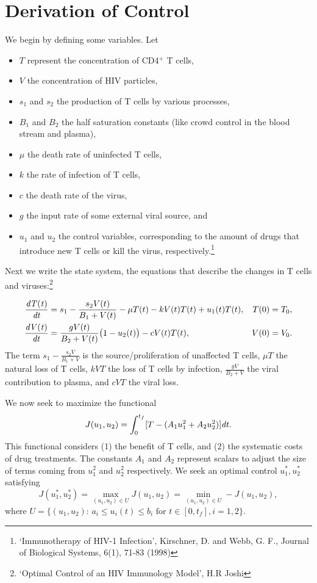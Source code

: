 \section*{Derivation of Control}
We begin by defining some variables.
Let

\begin{itemize}
    \item $T$ represent the concentration of CD4$^+$ T cells,
    \item $V$ the concentration of HIV particles,
    \item $s_1$ and $s_2$ the production of T cells by various processes,
    \item $B_1$ and $B_2$ the half saturation constants (like crowd control in the blood stream and plasma),
    \item $\mu$ the death rate of uninfected T cells,
    \item $k$ the rate of infection of T cells,
    \item $c$ the death rate of the virus,
    \item $g$ the input rate of some external viral source, and
    \item $u_1$ and $u_2$ the control variables, corresponding to the amount of drugs that introduce new T cells or kill the virus, respectively.\footnote{`Immunotherapy of HIV-1 Infection', Kirschner, D. and Webb, G. F., Journal of Biological Systems, 6(1), 71-83 (1998)}
\end{itemize}

Next we write the state system, the equations that describe the changes in T cells and viruses:\footnote{`Optimal Control of an HIV Immunology Model', H.R Joshi}

\begin{equation}
	\begin{alignedat}{2}
		\frac{\it{d}T(t)}{\it{dt}} &= s_1 - \frac{s_2V(t)}{B_1+V(t)} - \mu T(t)-kV(t)T(t)+u_1(t)T(t), \quad & T(0) &= T_0, \\
		\frac{\it{d}V(t)}{\it{dt}} &= \frac{gV(t)}{B_2+V(t)}\big(1-u_2(t)\big) - cV(t)T(t), & V(0) &= V_0.
	\end{alignedat}
    \label{eq:hiv:state}
\end{equation}
The term $s_1-\frac{s_2V}{B_1+V}$ is the source/proliferation of unaffected T cells, $\mu T$ the natural loss of T cells, $kVT$ the loss of T cells by infection, $\frac{gV}{B_2+V}$ the viral contribution to plasma, and $cVT$ the viral loss.

We now seek to maximize the functional 
\[
J(u_1,u_2) = \int_0^{t_f}[T-(A_1u_1^2+A_2u_2^2)]\it{dt}.
\]
This functional considers (1) the benefit of T cells, and (2) the systematic costs of drug treatments.
The constants $A_1$ and $A_2$ represent scalars to adjust the size of terms coming from $u_1^2$ and $u_2^2$ respectively.
We seek an optimal control $u_1^*,u_2^*$ satisfying
\[
J(u_1^*,u_2^*)=\max_{(u_1,u_2)\in U}J(u_1,u_2) =\min_{(u_1,u_2)\in U}-J(u_1,u_2),
\]
where $U=\{(u_1,u_2):\,a_i\le u_i(t) \le b_i\text{ for }t\in[0,t_f], i=1,2\}$.
 
